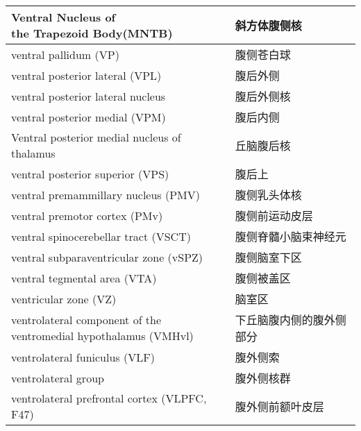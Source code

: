 \begin{longtable}{lll}
	\midrule
	\makecell[l]{Ventral Nucleus of \\the Trapezoid Body(MNTB)}   && 斜方体腹侧核  \\
	
	\midrule
	ventral pallidum (VP)  && 腹侧苍白球  \\
	
	\midrule
	ventral posterior lateral (VPL)   && 腹后外侧  \\
	
	\midrule
	ventral posterior lateral nucleus   && 腹后外侧核  \\
	
	\midrule
	ventral posterior medial (VPM)   && 腹后内侧  \\
	
	\midrule
	Ventral posterior medial nucleus of thalamus   && 丘脑腹后核  \\
	
	\midrule
	ventral posterior superior (VPS)   && 腹后上  \\
	
	\midrule
	ventral premammillary nucleus (PMV)  && 腹侧乳头体核  \\
	
	\midrule
	ventral premotor cortex (PMv)   && 腹侧前运动皮层  \\
	
	\midrule
	ventral spinocerebellar tract (VSCT)   && 腹侧脊髓小脑束神经元  \\
	
	\midrule
	ventral subparaventricular zone (vSPZ)  && 腹侧脑室下区  \\
	
	\midrule
	ventral tegmental area (VTA)   && 腹侧被盖区  \\
	
	\midrule
	ventricular zone (VZ)   && 脑室区  \\
	
	\midrule
	\makecell[l]{ventrolateral component of the \\ventromedial hypothalamus (VMHvl)}  && 下丘脑腹内侧的腹外侧部分  \\
	
	\midrule
	ventrolateral funiculus (VLF)   && 腹外侧索  \\
	
	\midrule
	ventrolateral group   && 腹外侧核群  \\
	
	\midrule
	ventrolateral prefrontal cortex (VLPFC, F47)   && 腹外侧前额叶皮层  \\
	

\end{longtable}
